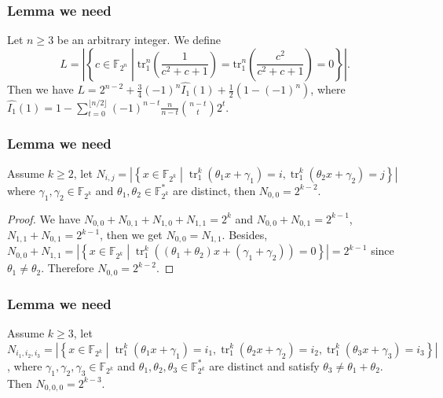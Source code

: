 \documentclass[
    aspectratio=169,                   %
]{beamer}
\newcommand{\F}{\mathbb{F}}
\newcommand{\tr}{\operatorname{tr}_1^k}
\begin{document}
    \begin{frame}
        \frametitle{Lemma we need}
        
        \begin{lemma}\label{Lemma:SumInv00}
            Let $n\geq 3$ be an arbitrary integer. We define
            \[	L=\left\lvert\left\{c\in\F_{2^n}\middle| \mathrm{tr}_1^n\left(\frac{1}{c^2+c+1}\right)=\mathrm{tr}_1^n\left(\frac{c^2}{c^2+c+1}\right)=0\right\}\right\rvert.\]
            Then we have $ L=2^{n-2}+\frac{3}{4}(-1)^n\widehat{I_1}(1)+\frac{1}{2}\left(1-(-1)^n\right) $, where $ \widehat{I_1}(1)=1-\sum_{t=0}^{\lfloor n/2\rfloor}(-1)^{n-t}\frac{n}{n-t}{{n-t}\choose {t}}2^t $.
        \end{lemma}
    \end{frame}
        
    \begin{frame}
        \frametitle{Lemma we need}
        
        \begin{lemma}\label{lemma:N_ij_trace}
            Assume  $ k\ge 2 $, let $ N_{i,j} =\left\lvert\left\{x\in\F_{2^k}\middle|\tr\left(\theta_1x+\gamma_1\right)=i,\tr\left(\theta_2x+\gamma_2\right)=j\right\}\right\rvert $ 
            where  $ \gamma_1,\gamma_2\in\F_{2^k} $ and $ \theta_1,\theta_2\in\F_{2^k}^* $ are distinct, then $ N_{0,0} =2^{k-2} $.
        \end{lemma}   
           
        \begin{proof}
            We have $ N_{0,0}+N_{0,1}+N_{1,0}+N_{1,1}=2^k $ and $ N_{0,0}+N_{0,1}=2^{k-1} $, $ N_{1,1}+N_{0,1}=2^{k-1}  $, then we get 
            $ N_{0,0} = N_{1,1} $. 
            Besides, $ N_{0,0}+N_{1,1} = \left\lvert\left\{x\in\F_{2^k}\middle|\tr\left((\theta_1+\theta_2)x+(\gamma_1+\gamma_2)\right)=0\right\}\right\rvert=2^{k-1} $  since $ \theta_1\ne \theta_2 $. 
            Therefore $ N_{0,0}=2^{k-2} $.
        \end{proof}
    \end{frame}

        \begin{frame}
            \frametitle{Lemma we need}
        
            \begin{lemma}\label{lemma:N_ijk_trace}
                Assume  $ k\ge 3 $, let $ N_{i_1,i_2,i_3}=\left\lvert\left\{x\in\F_{2^k}\middle| \tr\left(\theta_1x+\gamma_1\right)=i_1,\tr\left(\theta_2x+\gamma_2\right)=i_2,\tr\left(\theta_3x+\gamma_3\right)=i_3 \right\} \right\rvert$, 
              where  $ \gamma_1,\gamma_2,\gamma_3\in\F_{2^k} $ and $ \theta_1,\theta_2,\theta_3\in\F_{2^k}^* $ are distinct and satisfy 
              $ \theta_3\ne\theta_1+\theta_2 $. Then $ N_{0,0,0}= 2^{k-3} $.
          \end{lemma}
        \end{frame}
        
\end{document}

